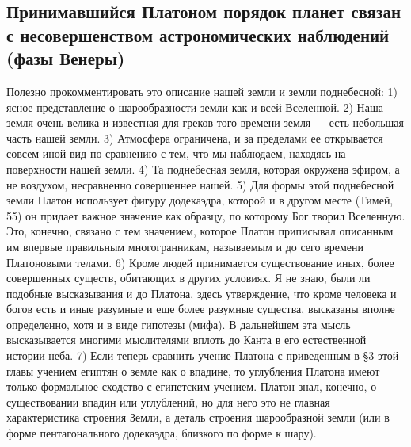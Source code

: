 \subsection{Принимавшийся   Платоном    порядок   планет    связан   с
несовершенством астрономических наблюдений (фазы Венеры)}

Полезно   прокомментировать  это   описание   нашей   земли  и   земли
поднебесной: 1) ясное представление о  шарообразности земли как и всей
Вселенной.  2) Наша  земля очень  велика и  известная для  греков того
времени  земля ---  есть  небольшая часть  нашей  земли. 3)  Атмосфера
ограничена, и за пределами ее открывается совсем иной вид по сравнению
с тем,  что мы наблюдаем, находясь  на поверхности нашей земли.  4) Та
поднебесная земля, которая окружена эфиром, а не воздухом, несравненно
совершеннее  нашей.  5)  Для   формы  этой  поднебесной  земли  Платон
использует фигуру додекаэдра, которой и  в другом месте (Тимей, 55) он
придает важное значение как образцу, по которому Бог творил Вселенную.
Это,  конечно,  связано с  тем  значением,  которое Платон  приписывал
описанным им  впервые правильным многогранникам, называемым  и до сего
времени Платоновыми  телами. 6) Кроме людей  принимается существование
иных, более  совершенных существ,  обитающих в  других условиях.  Я не
знаю, были ли  подобные высказывания и до  Платона, здесь утверждение,
что кроме человека  и богов есть и иные разумные  и еще более разумные
существа, высказаны вполне определенно, хотя и в виде гипотезы (мифа).
В  дальнейшем эта  мысль высказывается  многими мыслителями  вплоть до
Канта в его естественной истории  неба. 7) Если теперь сравнить учение
Платона с  приведенным в §3 этой  главы учением египтян о  земле как о
впадине,  то углубления  Платона  имеют только  формальное сходство  с
египетским учением.  Платон знал, конечно, о  существовании впадин или
углублений, но для него это  не главная характеристика строения Земли,
а  деталь строения  шарообразной  земли (или  в форме  пентагонального
додекаэдра, близкого по форме к шару).

